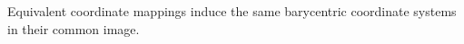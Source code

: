 Equivalent coordinate mappings induce the same barycentric coordinate systems in their common image.
